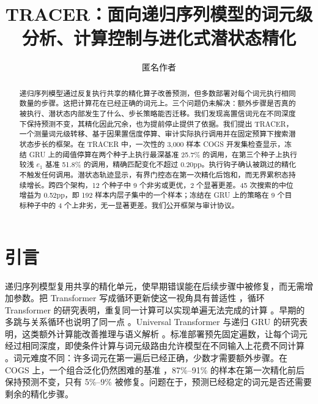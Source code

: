 \documentclass[12pt,a4paper]{article}
\title{TRACER：面向递归序列模型的词元级分析、计算控制与进化式潜状态精化}
\author{匿名作者}
\begin{document}
\maketitle

\begin{abstract}
递归序列模型通过反复执行共享的精化算子改善预测，但多数部署对每个词元执行相同数量的步骤。这把计算花在已经正确的词元上。三个问题仍未解决：额外步骤是否真的被执行、潜状态内部发生了什么、步长策略能否迁移。我们发现高置信词元在不同深度下保持预测不变，其精化因此冗余，也为提前停止提供了依据。我们提出 TRACER，一个测量词元级转移、基于因果置信度停算、审计实际执行调用并在固定预算下搜索潜状态步长的框架。在 TRACER 中，一次性的 3{,}000 样本 COGS 开发集检查显示，冻结 GRU 上的阈值停算在两个种子上执行最深基准 25.7\% 的调用，在第三个种子上执行较浅 $e_1$ 基准 51.8\% 的调用，精确匹配变化不超过 0.20pp。执行钩子确认被跳过的精化不触发任何调用。潜状态轨迹显示，有界门控态在第一次精化后饱和，而无界累积态持续增长。跨四个架构，12 个种子中 9 个非劣或更优，2 个显著更差。45 次搜索的中位增益为 0.52pp，即 192 样本内层子集中的一个样本；冻结在 GRU 上的策略在 9 个目标种子中的 4 个上非劣，无一显著更差。我们公开框架与审计协议。
\end{abstract}

\section{引言}
\label{sec:intro}

递归序列模型复用共享的精化单元，使早期错误能在后续步骤中被修复，而无需增加参数。把 Transformer 写成循环更新使这一视角具有普适性 \citep{katharopoulos2020transformers}，循环 Transformer 的研究表明，重复同一计算可以实现单遍无法完成的计算 \citep{giannou2023looped,yang2024looped}。早期的多跳与关系循环也说明了同一点 \citep{sukhbaatar2015memory,santoro2018relational}。Universal Transformer 与递归 GRU 的研究表明，这类额外计算能改善推理与语义解析 \citep{dehghani2019universal,graves2016adaptive}。标准部署预先固定遍数，让每个词元经过相同深度，即使条件计算与词元级路由允许模型在不同输入上花费不同计算 \citep{fedus2022switch,raposo2024mixture}。词元难度不同：许多词元在第一遍后已经正确，少数才需要额外步骤。在 COGS \citep{kim2020cogs} 上，一个组合泛化仍然困难的基准 \citep{lake2018generalization,oren2020improving}，87\%--91\% 的样本在第一次精化前后保持预测不变，只有 5\%--9\% 被修复。问题在于，预测已经稳定的词元是否还需要剩余的精化步骤。
\end{document}
